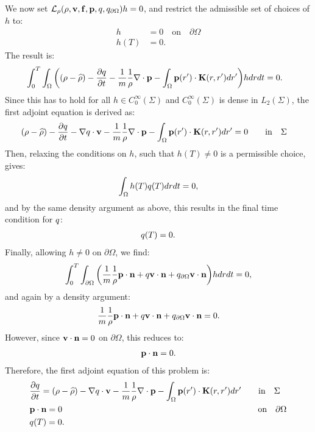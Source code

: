 We now set $\mathcal{L}_\rho(\rho,\mathbf{v},\mathbf{f},\mathbf{p},q,{q}_{\partial \Omega})h=0$, and restrict the admissible set of choices of $h$ to:
\begin{align*}
h&=0 \quad \text{on} \quad \partial \Omega\\
h(T)&=0.
\end{align*}
The result is:
\begin{align*}
 &\int_0^T \int_\Omega \bigg((\rho - \widehat {\rho}) - \frac{\partial q}{\partial t} -\frac{1}{m} \frac{1}{\rho}\nabla \cdot \mathbf{p}  -  \int_\Omega  \mathbf{p}(r') \cdot\mathbf{K}(r,r')   dr'  \bigg)hdr dt =0.
\end{align*}
Since this has to hold for all $h \in C_0^\infty(\Sigma)$ and $C_0^\infty(\Sigma)$ is dense in $L_2(\Sigma)$, the first adjoint equation is derived as:
\begin{align}
&(\rho - \widehat {\rho}) - \frac{\partial q}{\partial t} - \nabla q \cdot \mathbf{v} -\frac{1}{m} \frac{1}{\rho}\nabla \cdot \mathbf{p}   -  \int_\Omega  \mathbf{p}(r') \cdot\mathbf{K}(r,r')   dr' = 0  \qquad \text{in} \quad \Sigma \notag
\end{align}
Then, relaxing the conditions on $h$, such that $h(T) \neq 0$ is a permissible choice, gives:
\begin{align*}
\int_\Omega h(T) q(T) dr dt=0,
\end{align*}
and by the same density argument as above, this results in the final time condition for $q$:
\begin{align*}
q(T) = {0} .
\end{align*}
Finally, allowing $h \neq 0$ on $\partial\Omega$, we find:
\begin{align*}
\int_0^T \int_{\partial \Omega} \bigg( \frac{1}{m} \frac{1}{\rho} \mathbf{p} \cdot \mathbf{n}  + q \mathbf{v} \cdot \mathbf{n}   +{q}_{\partial \Omega} \mathbf{v} \cdot \mathbf{n}\bigg)h  dr dt=0,
\end{align*}
and again by a density argument:
\begin{align*}
\frac{1}{m} \frac{1}{\rho} \mathbf{p} \cdot \mathbf{n}  +  q \mathbf{v} \cdot \mathbf{n}   +{q}_{\partial \Omega} \mathbf{v} \cdot \mathbf{n} = 0.
\end{align*}
However, since $\mathbf{v} \cdot \mathbf{n} =0$ on $ \partial\Omega$,  this reduces to:
\begin{align*}
\mathbf{p} \cdot \mathbf{n}  = 0.
\end{align*}
Therefore, the first adjoint equation of this problem is:
\begin{align}
\label{eqn:INAdj1}
&  \frac{\partial q}{\partial t}  = (\rho - \widehat {\rho})- \nabla q \cdot \mathbf{v} -\frac{1}{m} \frac{1}{\rho}\nabla \cdot \mathbf{p} -  \int_\Omega  \mathbf{p}(r') \cdot\mathbf{K}(r,r')   dr'  \qquad \text{in} \quad \Sigma \\
&\mathbf{p} \cdot \mathbf{n}  = 0 \qquad \qquad\qquad \qquad\qquad \qquad\qquad \qquad\qquad \qquad\qquad\quad \text{on} \quad \partial \Omega \notag \\
 &q(T) = {0} . \notag
\end{align}


